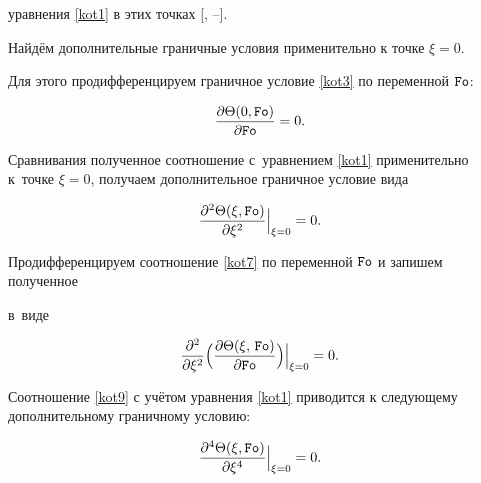 уравнения \eqref{kot1} в этих точках [, --].



Найдём дополнительные граничные условия применительно к точке \mbox{$\xi=0$}.

Для этого продифференцируем  граничное условие \eqref{kot3} по переменной $\mbox{\tt Fo}$:

$$

\frac{\partial\Theta (0,\mbox{\tt Fo})}{\partial\mbox{\tt Fo}}=0.

$$

Сравнивания полученное соотношение с~уравнением \eqref{kot1} применительно к~точке \mbox{$\xi=0$}, получаем дополнительное граничное условие вида

\begin{equation}

\label{kot7}

\frac{\partial^2\Theta(\xi,\mbox{\tt Fo})}{\partial\xi^2}\Bigr|_{\xi=0}=0.

\end{equation}



Продифференцируем соотношение \eqref{kot7} по переменной $\mbox{\tt Fo}$ и запишем полученное 






в~виде 

\begin{equation}

\label{kot9}

\frac{\partial^2}{\partial\xi^2}\Bigl(\frac{\partial\Theta(\xi,\,\mbox{\tt Fo})}{\partial\mbox{\tt Fo}}\Bigr)\Bigr|_{\xi=0}=0.

\end{equation}



Соотношение \eqref{kot9} с учётом уравнения \eqref{kot1} приводится к следующему дополнительному граничному условию:

\begin{equation}

\label{kot10}

\frac{\partial^4\Theta(\xi,\mbox{\tt Fo})}{\partial\xi^4}\Bigr|_{\xi=0}=0.

\end{equation}



